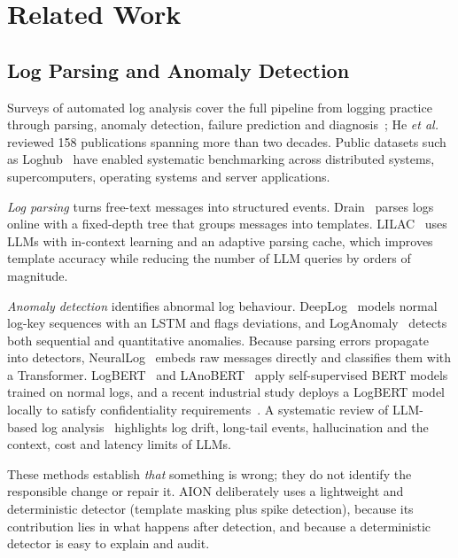 \documentclass[conference]{IEEEtran}
\begin{document}
\section{Related Work}
\label{sec:related}
\subsection{Log Parsing and Anomaly Detection}
Surveys of automated log analysis cover the full pipeline from logging practice through parsing, anomaly detection, failure prediction and diagnosis~\cite{he2021survey}; He \emph{et al.} reviewed 158 publications spanning more than two decades. Public datasets such as Loghub~\cite{zhu2023loghub} have enabled systematic benchmarking across distributed systems, supercomputers, operating systems and server applications.

\emph{Log parsing} turns free-text messages into structured events. Drain~\cite{he2017drain} parses logs online with a fixed-depth tree that groups messages into templates. LILAC~\cite{jiang2024lilac} uses LLMs with in-context learning and an adaptive parsing cache, which improves template accuracy while reducing the number of LLM queries by orders of magnitude.

\emph{Anomaly detection} identifies abnormal log behaviour. DeepLog~\cite{du2017deeplog} models normal log-key sequences with an LSTM and flags deviations, and LogAnomaly~\cite{meng2019loganomaly} detects both sequential and quantitative anomalies. Because parsing errors propagate into detectors, NeuralLog~\cite{le2021neurallog} embeds raw messages directly and classifies them with a Transformer. LogBERT~\cite{guo2021logbert} and LAnoBERT~\cite{lee2023lanobert} apply self-supervised BERT models trained on normal logs, and a recent industrial study deploys a LogBERT model locally to satisfy confidentiality requirements~\cite{delacruz2026loganomaly}. A systematic review of LLM-based log analysis~\cite{ma2026llm4log} highlights log drift, long-tail events, hallucination and the context, cost and latency limits of LLMs.

These methods establish \emph{that} something is wrong; they do not identify the responsible change or repair it. AION deliberately uses a lightweight and deterministic detector (template masking plus spike detection), because its contribution lies in what happens after detection, and because a deterministic detector is easy to explain and audit.
\end{document}
